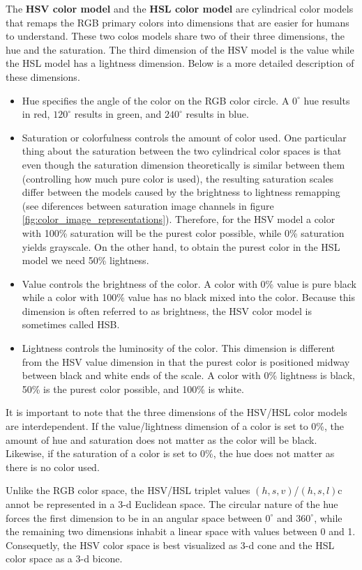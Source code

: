 The \textbf{HSV color model} and the \textbf{HSL color model} are cylindrical color models that remaps the RGB primary colors into dimensions that are easier for humans to understand. These two colos models share two of their three dimensions, the hue and the saturation. The third dimension of the HSV model is the value while the HSL model has a lightness dimension. Below is a more detailed description of these dimensions.

\begin{itemize}
	\item Hue specifies the angle of the color on the RGB color circle. A $0^\circ$ hue results in red, $120^\circ$ results in green, and $240^\circ$ results in blue.
	\item Saturation or colorfulness controls the amount of color used. One particular thing about the saturation between the two cylindrical color spaces is that even though the saturation dimension theoretically is similar between them (controlling how much pure color is used), the resulting saturation scales differ between the models caused by the brightness to lightness remapping (see diferences between saturation image channels in figure \ref{fig:color_image_representations}). Therefore, for the HSV model a color with 100\% saturation will be the purest color possible, while 0\% saturation yields grayscale. On the other hand, to obtain the purest color in the HSL model we need 50\% lightness.
	\item Value controls the brightness of the color. A color with 0\% value is pure black while a color with 100\% value has no black mixed into the color. Because this dimension is often referred to as brightness, the HSV color model is sometimes called HSB.
	\item Lightness controls the luminosity of the color. This dimension is different from the HSV value dimension in that the purest color is positioned midway between black and white ends of the scale. A color with 0\% lightness is black, 50\% is the purest color possible, and 100\% is white.
\end{itemize}

It is important to note that the three dimensions of the HSV/HSL color models are interdependent. If the value/lightness dimension of a color is set to 0\%, the amount of hue and saturation does not matter as the color will be black. Likewise, if the saturation of a color is set to 0\%, the hue does not matter as there is no color used.

Unlike the RGB color space, the HSV/HSL triplet values $(h,s,v)$/$(h,s,l)$c annot be represented in a 3-d Euclidean space. The circular nature of the hue forces the first dimension to be in an angular space between $0^\circ$ and $360^\circ$, while the remaining two dimensions inhabit a linear space with values between 0 and 1. Consequetly, the HSV color space is best visualized as 3-d cone and the HSL color space as a 3-d bicone. 

